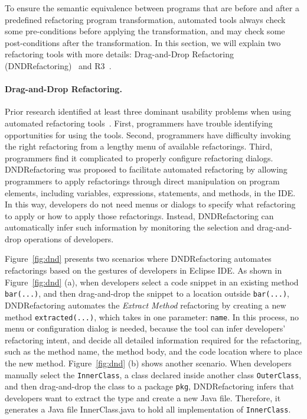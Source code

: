 \documentclass[runningheads,a4paper]{llncs}
\newcommand{\codefont}[1]{\footnotesize{\texttt{#1}}\normalsize}
\begin{document}
To ensure the semantic equivalence between programs that are before and after a predefined refactoring program transformation, automated tools always check some pre-conditions before applying the transformation, and may check some post-conditions after the transformation.
In this section, we will explain two refactoring tools with more details: Drag-and-Drop Refactoring (DNDRefactoring)~\cite{Lee:2013} and R3~\cite{Kim:2016}.

\paragraph{Drag-and-Drop Refactoring.} Prior research identified at least three dominant usability problems when using automated refactoring tools~\cite{OConnor:2005,Mealy:2007,Parnin:2008,Murphy-Hill:2008,Murphy-Hill:2011,Vakilian:2012}. First, programmers have trouble identifying opportunities for using the tools. Second, programmers have difficulty invoking the right refactoring from a lengthy menu of available refactorings. Third, programmers find it complicated to properly configure refactoring dialogs. DNDRefactoring was proposed to facilitate automated refactoring by allowing programmers to apply refactorings through direct manipulation on program elements, including variables, expressions, statements, and methods, in the IDE. In this way, developers do not need menus or dialogs to specify what refactoring to apply or how to apply those refactorings. Instead, DNDRefactoring can automatically infer such information by monitoring the selection and drag-and-drop operations of developers.

Figure~\ref{fig:dnd} presents two scenarios where DNDRefactoring automates refactorings based on the gestures of developers in Eclipse IDE. As shown in Figure~\ref{fig:dnd} (a), when developers select a code snippet in an existing method \codefont{bar(...)}, and then drag-and-drop the snippet to a location outside \codefont{bar(...)}, DNDRefactoring automates the \emph{Extract Method} refactoring by creating a new method \codefont{extracted(...)}, which takes in one parameter: \codefont{name}. In this process, no menu or configuration dialog is needed, because the tool can infer developers' refactoring intent, and decide all detailed information required for the refactoring, such as the method name, the method body, and the code location where to place the new method. Figure~\ref{fig:dnd} (b) shows another scenario. When developers manually select the \codefont{InnerClass}, a class declared inside another class \codefont{OuterClass}, and then drag-and-drop the class to a package \codefont{pkg}, DNDRefactoring infers that developers want to extract the type and create a new Java file. Therefore, it generates a Java file InnerClass.java to hold all implementation of \codefont{InnerClass}.
\end{document}
